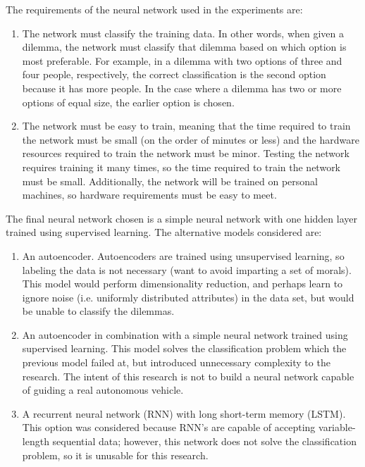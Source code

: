 \documentclass{report}
\begin{document}
The requirements of the neural network used in the experiments are:
\begin{enumerate}
    \item The network must classify the training data. In other words, when given a dilemma, the
    network must classify that dilemma based on which option is most preferable. For example, in a
    dilemma with two options of three and four people, respectively, the correct classification is
    the second option because it has more people. In the case where a dilemma has two or more
    options of equal size, the earlier option is chosen.
    
    \item The network must be easy to train, meaning that the time required to train the network
    must be small (on the order of minutes or less) and the hardware resources required to train the
    network must be minor. Testing the network requires training it many times, so the time required
    to train the network must be small. Additionally, the network will be trained on personal
    machines, so hardware requirements must be easy to meet.
\end{enumerate}

The final neural network chosen is a simple neural network with one hidden layer trained using
supervised learning. The alternative models considered are:
\begin{enumerate}
    \item An autoencoder. Autoencoders are trained using unsupervised learning, so labeling the data
    is not necessary (want to avoid imparting a set of morals). This model would perform
    dimensionality reduction, and perhaps learn to ignore noise (i.e. uniformly distributed
    attributes) in the data set, but would be unable to classify the dilemmas.
    
    \item An autoencoder in combination with a simple neural network trained using supervised
    learning. This model solves the classification problem which the previous model failed at, but
    introduced unnecessary complexity to the research. The intent of this research is not to build a
    neural network capable of guiding a real autonomous vehicle.
    
    \item A recurrent neural network (RNN) with long short-term memory (LSTM). This option was
    considered because RNN's are capable of accepting variable-length sequential data; however, this
    network does not solve the classification problem, so it is unusable for this research.
\end{enumerate}
\end{document}

